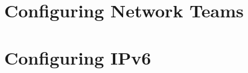 
\usepackage{minted}
\usepackage{booktabs}


	
	
	\section{Configuring Network Teams}
	
	
	\section{Configuring IPv6} 
	



